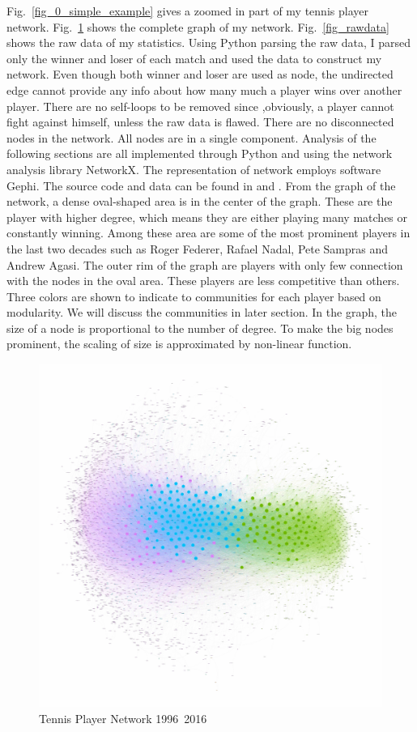 \documentclass[runningheads]{llncs}
\begin{document}
Fig.~\ref{fig_0_simple_example} gives a zoomed in part of my tennis player network.
Fig.~\ref{fig_mynk} shows the complete graph of my network.
Fig.~\ref{fig_rawdata} shows the raw data of my statistics. Using Python parsing the raw data, I parsed only the winner and loser of each match and used the data to construct my network.
Even though both winner and loser are used as node, the undirected edge cannot provide any info about how many much a player wins over another player. There are no self-loops to be removed since ,obviously, a player cannot fight against himself, unless the raw data is flawed. There are no disconnected nodes in the network. All nodes are in a single component. Analysis of the following sections are all implemented through Python and using the network analysis library NetworkX. The representation of network employs software Gephi. The source code and data can be found in \cite{ref_url1} and \cite{ref_url2}. 
From the graph of the network, a dense oval-shaped area is in the center of the graph. These are the player with higher degree, which means they are either playing many matches or constantly winning. Among these area are some of the most prominent players in the last two decades such as Roger Federer, Rafael Nadal, Pete Sampras and Andrew Agasi. The outer rim of the graph are players with only few connection with the nodes in the oval area. These players are less competitive than others. Three colors are shown to indicate to communities for each player based on modularity. We will discuss the communities in later section. In the graph, the size of a node is proportional to the number of degree. To make the big nodes prominent, the scaling of size is approximated by non-linear function.



\begin{figure}[ht]
\includegraphics[width=\textwidth]{1_graph}
\caption{Tennis Player Network 1996~2016} \label{fig_mynk}
\end{figure}
\end{document}
